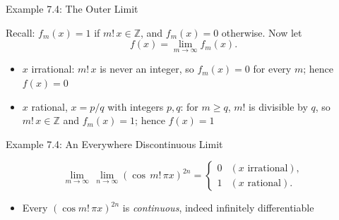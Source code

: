 \documentclass[aspectratio=169,12pt,t]{beamer}
\begin{document}
{%
\begin{frame}{Example 7.4: The Outer Limit}

  \begin{hlbox}  Recall: $f_m(x) = 1$ if $m!\,x \in \mathbb{Z}$, and $f_m(x) = 0$ otherwise.
  Now let
  \[
    f(x) = \lim_{m \to \infty} f_m(x).
  \]

  \begin{itemize}
    \item $x$ \alert{irrational}: $m!\,x$ is never an integer, so $f_m(x) = 0$
      for every $m$; hence $f(x) = 0$
    \item $x$ \alert{rational}, $x = p/q$ with integers $p, q$: for $m \geq q$,
      $m!$ is divisible by $q$, so $m!\,x \in \mathbb{Z}$ and $f_m(x) = 1$;
      hence $f(x) = 1$
  \end{itemize}
  \end{hlbox}

\end{frame}

\begin{frame}{Example 7.4: An Everywhere Discontinuous Limit}

  \begin{hlbox}  \begin{equation}
    \lim_{m \to \infty}\, \lim_{n \to \infty} (\cos\, m!\,\pi x)^{2n}
    = \begin{cases} 0 & (x \text{ irrational}), \\ 1 & (x \text{ rational}). \end{cases} \tag{8}
  \end{equation}

  \vspace{0.4em}
  \begin{itemize}
    \item Every $(\cos m!\,\pi x)^{2n}$ is \emph{continuous}, indeed infinitely
      differentiable
  \end{itemize}
  \end{hlbox}


\end{frame}}
\end{document}
